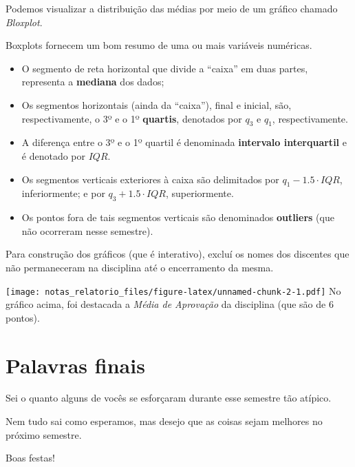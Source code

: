 \documentclass[
]{book}
\providecommand{\tightlist}{%
  \setlength{\itemsep}{0pt}\setlength{\parskip}{0pt}}
\begin{document}
Podemos visualizar a distribuição das médias por meio de um gráfico chamado \emph{Bloxplot}.

Boxplots fornecem um bom resumo de uma ou mais variáveis numéricas.

\begin{itemize}
\tightlist
\item
  O segmento de reta horizontal que divide a ``caixa'' em duas partes, representa a \textbf{mediana} dos dados;
\item
  Os segmentos horizontais (ainda da ``caixa''), final e inicial, são, respectivamente, o 3º e o 1º \textbf{quartis}, denotados por \(q_3\) e \(q_1\), respectivamente.
\item
  A diferença entre o 3º e o 1º quartil é denominada \textbf{intervalo interquartil}
  e é denotado por \(IQR\).
\item
  Os segmentos verticais exteriores à caixa são delimitados por \(q_1 - 1.5\cdot IQR\), inferiormente; e por \(q_3 + 1.5\cdot IQR\), superiormente.
\item
  Os pontos fora de tais segmentos verticais são denominados \textbf{outliers} (que não ocorreram nesse semestre).
\end{itemize}

Para construção dos gráficos (que é interativo), excluí os nomes dos discentes que não permaneceram na disciplina até o encerramento da mesma.

\texttt{[image: notas\_relatorio\_files/figure-latex/unnamed-chunk-2-1.pdf]}
No gráfico acima, foi destacada a \emph{Média de Aprovação} da disciplina (que são de 6 pontos).

\hypertarget{palavras-finais}{%
\chapter{Palavras finais}\label{palavras-finais}}

Sei o quanto alguns de vocês se esforçaram durante esse semestre tão atípico.

Nem tudo sai como esperamos, mas desejo que as coisas sejam melhores no próximo semestre.

Boas festas!

  
\end{document}

